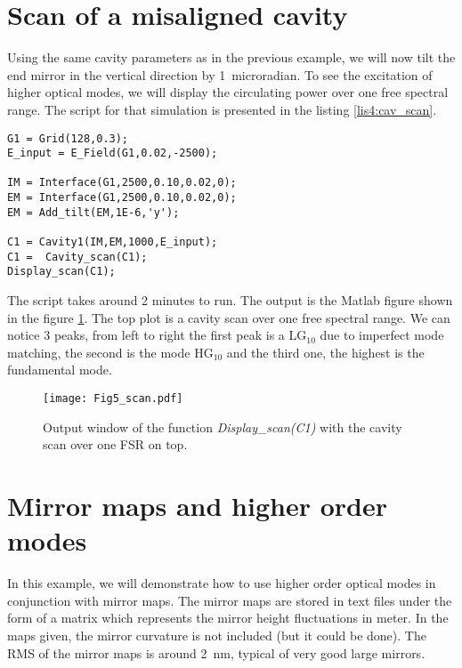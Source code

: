 \section{Scan of a misaligned cavity}

Using the same cavity parameters as in the previous example, we will now tilt the end mirror in the vertical direction by 1~microradian. To see the excitation of higher optical modes, we will display the circulating power over one free spectral range. The script for that simulation is presented in the listing \ref{lis4:cav_scan}.

\begin{lstlisting}[float=htp,caption=Example of OSCAR script to scan a cavity \label{lis4:cav_scan},frame=lines]
G1 = Grid(128,0.3);
E_input = E_Field(G1,0.02,-2500);

IM = Interface(G1,2500,0.10,0.02,0);
EM = Interface(G1,2500,0.10,0.02,0);
EM = Add_tilt(EM,1E-6,'y');

C1 = Cavity1(IM,EM,1000,E_input);
C1 =  Cavity_scan(C1);
Display_scan(C1);
\end{lstlisting}

The script takes around 2 minutes to run. The output is the Matlab figure shown in the figure \ref{fig4:scan}. The top plot is a cavity scan over one free spectral range. We can notice 3 peaks, from left to right the first peak is a LG$_{10}$ due to imperfect mode matching, the second is the mode HG$_{10}$ and the third one, the highest is the fundamental mode.

\begin{figure}
\begin{center}
\texttt{[image: Fig5\_scan.pdf]}
\end{center}
\caption{\label{fig4:scan} Output window of the function \emph{Display\_scan(C1)} with the cavity scan over one FSR on top.}
\end{figure}

\section{Mirror maps and higher order modes}

In this example, we will demonstrate how to use higher order optical modes in conjunction with mirror maps. The mirror maps are stored in text files under the form of a matrix which represents the mirror height fluctuations in meter. In the maps given, the mirror curvature is not included (but it could be done). The RMS of the mirror maps is around 2~nm, typical of very good large mirrors.

